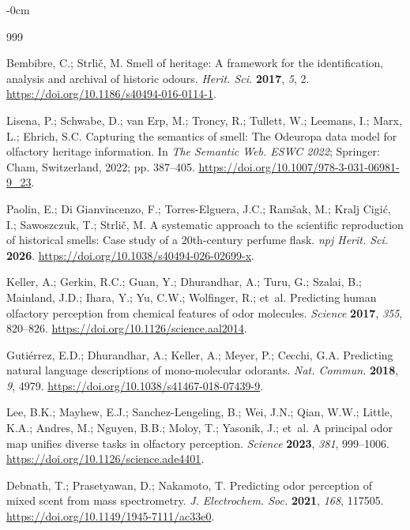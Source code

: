 \documentclass[applsci,article,submit,oneauthor]{Definitions/mdpi}
\begin{document}
\begin{adjustwidth}{-\extralength}{0cm}
\begin{thebibliography}{999}

 Bembibre, C.; Strli\v{c}, M. Smell of heritage: A framework for the identification, analysis and archival of historic odours. \emph{Herit. Sci.} \textbf{2017}, \emph{5}, 2. \url{https://doi.org/10.1186/s40494-016-0114-1}.

 Lisena, P.; Schwabe, D.; van Erp, M.; Troncy, R.; Tullett, W.; Leemans, I.; Marx, L.; Ehrich, S.C. Capturing the semantics of smell: The Odeuropa data model for olfactory heritage information. In \emph{The Semantic Web. ESWC 2022}; Springer: Cham, Switzerland, 2022; pp. 387--405. \url{https://doi.org/10.1007/978-3-031-06981-9_23}.

 Paolin, E.; Di Gianvincenzo, F.; Torres-Elguera, J.C.; Ram\v{s}ak, M.; Kralj Cigi\'{c}, I.; Sawoszczuk, T.; Strli\v{c}, M. A systematic approach to the scientific reproduction of historical smells: Case study of a 20th-century perfume flask. \emph{npj Herit. Sci.} \textbf{2026}. \url{https://doi.org/10.1038/s40494-026-02699-x}.

 Keller, A.; Gerkin, R.C.; Guan, Y.; Dhurandhar, A.; Turu, G.; Szalai, B.; Mainland, J.D.; Ihara, Y.; Yu, C.W.; Wolfinger, R.; et~al. Predicting human olfactory perception from chemical features of odor molecules. \emph{Science} \textbf{2017}, \emph{355}, 820--826. \url{https://doi.org/10.1126/science.aal2014}.

 Guti\'{e}rrez, E.D.; Dhurandhar, A.; Keller, A.; Meyer, P.; Cecchi, G.A. Predicting natural language descriptions of mono-molecular odorants. \emph{Nat. Commun.} \textbf{2018}, \emph{9}, 4979. \url{https://doi.org/10.1038/s41467-018-07439-9}.

 Lee, B.K.; Mayhew, E.J.; Sanchez-Lengeling, B.; Wei, J.N.; Qian, W.W.; Little, K.A.; Andres, M.; Nguyen, B.B.; Moloy, T.; Yasonik, J.; et~al. A principal odor map unifies diverse tasks in olfactory perception. \emph{Science} \textbf{2023}, \emph{381}, 999--1006. \url{https://doi.org/10.1126/science.ade4401}.

 Debnath, T.; Prasetyawan, D.; Nakamoto, T. Predicting odor perception of mixed scent from mass spectrometry. \emph{J. Electrochem. Soc.} \textbf{2021}, \emph{168}, 117505. \url{https://doi.org/10.1149/1945-7111/ac33e0}.


\end{thebibliography}
\end{adjustwidth}
\end{document}
